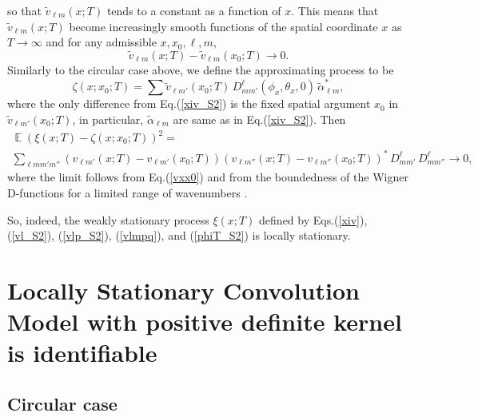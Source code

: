 \documentclass[12pt]{article}
\DeclareMathOperator{\Ex}{\mathbb{E}}
\begin{document}
so that $\widetilde v_{\ell m}(x;T)$ tends to a constant as a function of $x$.
This means that $\widetilde v_{\ell m}(x;T)$ become increasingly smooth functions
of the spatial coordinate $x$  as $T \to \infty$ and for any admissible $x,x_0, \ell, m$,
%
\begin {equation}
\label{vxx0}
\widetilde v_{\ell m}(x;T) - \widetilde v_{\ell m}(x_0;T) \to 0.
\end {equation}
%
Similarly to the circular case above, we define the approximating process to be
%
\begin {equation}
\label{zeta_S2}
\zeta(x;x_0;T) = \sum \widetilde v_{\ell m'}(x_0;T)\, D^{\ell}_{mm'}(\phi_x, \theta_x, 0)  \,\widetilde\alpha_{\ell m}^*,
\end {equation}
%
where the only difference from   Eq.(\ref{xiv_S2})  is the fixed spatial argument $x_0$
in $\widetilde v_{\ell m'}(x_0;T)$, in particular, $\widetilde\alpha_{\ell m}$ are same as in Eq.(\ref{xiv_S2}).
Then
%
\begin {multline}
\label{Edxi3}
\Ex(\xi(x;T) - \zeta(x; x_0;T))^2 = \\
\sum_{\ell m m' m''} (v_{\ell m'}(x;T) - v_{\ell m'}(x_0;T)) (v_{\ell m''}(x;T) - v_{\ell m''}(x_0;T))^*
   \, D^{\ell}_{mm'} \, D^{\ell}_{mm''}  \to 0, 
\end {multline}
%
where the limit follows from Eq.(\ref{vxx0}) and from the 
boundedness of the Wigner D-functions for a limited range of wavenumbers \citep[][sec. 4.3]{Varshalovich}.

So, indeed, the weakly stationary process $\xi(x;T)$ defined by 
Eqs.(\ref{xiv}), (\ref{vl_S2}), (\ref{vlp_S2}), (\ref{vlmpq}), and
(\ref{phiT_S2}) is
locally stationary.






\section{Locally Stationary Convolution Model with positive definite kernel is identifiable}
\label{App_identif}


\subsection{Circular case}
\label{App_identif_circ}
\end{document}
